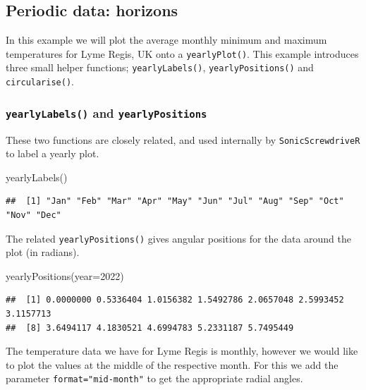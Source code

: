\documentclass[
]{book}
\newenvironment{Shaded}{\begin{snugshade}}{\end{snugshade}}
\newcommand{\AttributeTok}[1]{\textcolor[rgb]{0.77,0.63,0.00}{#1}}
\newcommand{\DecValTok}[1]{\textcolor[rgb]{0.00,0.00,0.81}{#1}}
\newcommand{\FunctionTok}[1]{\textcolor[rgb]{0.00,0.00,0.00}{#1}}
\newcommand{\NormalTok}[1]{#1}
\begin{document}
\hypertarget{periodic-data-horizons}{%
\subsection{Periodic data: horizons}\label{periodic-data-horizons}}

In this example we will plot the average monthly minimum and maximum temperatures for Lyme Regis, UK onto a \texttt{yearlyPlot()}. This example introduces three small helper functions; \texttt{yearlyLabels()}, \texttt{yearlyPositions()} and \texttt{circularise()}.

\hypertarget{yearlylabels-and-yearlypositions}{%
\subsubsection{\texorpdfstring{\texttt{yearlyLabels()} and \texttt{yearlyPositions}}{yearlyLabels() and yearlyPositions}}\label{yearlylabels-and-yearlypositions}}

These two functions are closely related, and used internally by \texttt{SonicScrewdriveR} to label a yearly plot.

\begin{Shaded}
\begin{Highlighting}[]
\FunctionTok{yearlyLabels}\NormalTok{()}
\end{Highlighting}
\end{Shaded}

\begin{verbatim}
##  [1] "Jan" "Feb" "Mar" "Apr" "May" "Jun" "Jul" "Aug" "Sep" "Oct" "Nov" "Dec"
\end{verbatim}

The related \texttt{yearlyPositions()} gives angular positions for the data around the plot (in radians).

\begin{Shaded}
\begin{Highlighting}[]
\FunctionTok{yearlyPositions}\NormalTok{(}\AttributeTok{year=}\DecValTok{2022}\NormalTok{)}
\end{Highlighting}
\end{Shaded}

\begin{verbatim}
##  [1] 0.0000000 0.5336404 1.0156382 1.5492786 2.0657048 2.5993452 3.1157713
##  [8] 3.6494117 4.1830521 4.6994783 5.2331187 5.7495449
\end{verbatim}

The temperature data we have for Lyme Regis is monthly, however we would like to plot the values at the middle of the respective month. For this we add the parameter \texttt{format="mid-month"} to get the appropriate radial angles.
\end{document}

